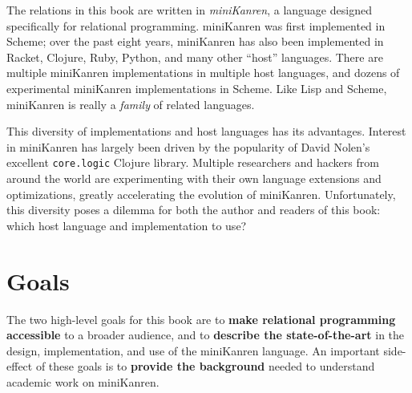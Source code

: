 The relations in this book are written in \emph{miniKanren}, a language
designed specifically for relational programming.
%
miniKanren was first implemented in Scheme; over the past eight years,
miniKanren has also been implemented in Racket,
 Clojure, Ruby, Python,
and many other ``host'' languages.
%
There are multiple miniKanren implementations in multiple host
languages, and dozens of experimental miniKanren
implementations in Scheme.
%
Like Lisp and Scheme, miniKanren is really a \emph{family} of related
languages.
%

This diversity of implementations and host languages has its advantages.
%
Interest in miniKanren has largely been driven by the popularity of
David Nolen's excellent {\tt core.logic} Clojure library.
%
Multiple researchers and hackers from around the world are
experimenting with their own language extensions and optimizations,
greatly accelerating the evolution of miniKanren.
%
Unfortunately, this diversity poses a dilemma for both the author
and readers of this book: which host language and implementation to
use?








\section{Goals}\label{sec:preface:goals}


The two high-level goals for this book are to {\bf make relational programming
accessible} to a broader audience, and to {\bf describe the state-of-the-art}
in the design, implementation, and use of the miniKanren language.
%
An important side-effect of these goals is to {\bf provide the background}
needed to understand academic work on miniKanren.

